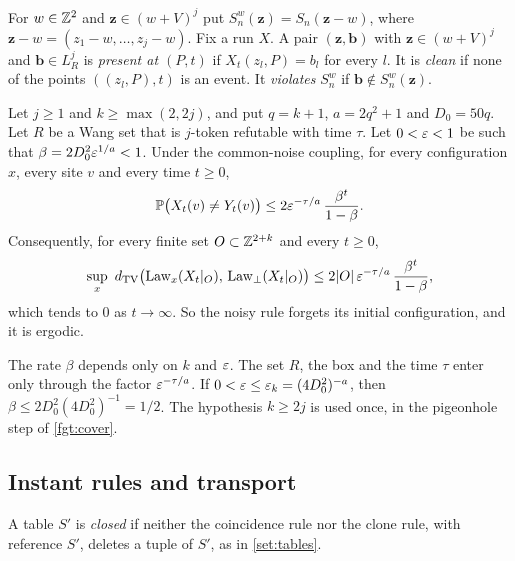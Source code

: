 For $w\in\mathbb{Z}^2$ and $\mathbf z\in(w+V)^j$ put $S^w_n(\mathbf z)=S_n(\mathbf z-w)$, where $\mathbf z-w=(z_1-w,\dots,z_j-w)$. Fix a run $X$. A pair $(\mathbf z,\mathbf b)$ with $\mathbf z\in(w+V)^j$ and $\mathbf b\in L_R^j$ is \emph{present at $(P,t)$} if $X_t(z_l,P)=b_l$ for every $l$. It is \emph{clean} if none of the points $((z_l,P),t)$ is an event. It \emph{violates} $S^w_n$ if $\mathbf b\notin S^w_n(\mathbf z)$.

\begin{theorem}[forgetting]\label{thm:forgetting}
Let $j\ge1$ and $k\ge\max(2,2j)$, and put $q=k+1$, $a=2q^2+1$ and $D_0=50q$. Let $R$ be a Wang set that is $j$-token refutable with time $\tau$. Let $0<\varepsilon<1$ be such that $\beta=2D_0^2\varepsilon^{1/a}<1$. Under the common-noise coupling, for every configuration $x$, every site $v$ and every time $t\ge0$,
\begin{equation}\label{fgt:eq-main}
\mathbb{P}\bigl(X_t(v)\ne Y_t(v)\bigr)\le 2\varepsilon^{-\tau/a}\,\frac{\beta^t}{1-\beta}.
\end{equation}
Consequently, for every finite set $O\subset\mathbb{Z}^{2+k}$ and every $t\ge0$,
\begin{equation}\label{fgt:eq-tv}
\sup_x\ \dtv\bigl(\mathrm{Law}_x(X_t|_O),\,\mathrm{Law}_\bot(X_t|_O)\bigr)\le 2|O|\,\eps^{-\tau/a}\,\frac{\beta^t}{1-\beta},
\end{equation}
which tends to $0$ as $t\to\infty$. So the noisy rule forgets its initial configuration, and it is ergodic.
\end{theorem}

\begin{remark}\label{fgt:rem-constants}
The rate $\beta$ depends only on $k$ and $\varepsilon$. The set $R$, the box and the time $\tau$ enter only through the factor $\varepsilon^{-\tau/a}$. If $0<\varepsilon\le\varepsilon_k=(4D_0^2)^{-a}$, then $\beta\le2D_0^2(4D_0^2)^{-1}=1/2$. The hypothesis $k\ge2j$ is used once, in the pigeonhole step of \cref{fgt:cover}.
\end{remark}

\subsection{Instant rules and transport}\label{fgt:sec-transport}

A table $S'$ is \emph{closed} if neither the coincidence rule nor the clone rule, with reference $S'$, deletes a tuple of $S'$, as in \cref{set:tables}.

